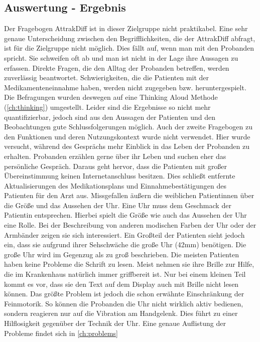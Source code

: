 \subsection{Auswertung - Ergebnis}
Der Fragebogen AttrakDiff ist in dieser Zielgruppe nicht praktikabel. Eine sehr genaue Unterscheidung zwischen den Begrifflichkeiten, die der  AttrakDiff abfragt, ist für die Zielgruppe nicht möglich. Dies fällt auf, wenn man mit den Probanden spricht. Sie schweifen oft ab und man ist nicht in der Lage ihre Aussagen zu erfassen. Direkte Fragen, die den Alltag der Probanden betreffen, werden zuverlässig beantwortet. Schwierigkeiten, die die Patienten mit der Medikamenteneinnahme haben,  werden nicht zugegeben bzw. heruntergespielt.
Die Befragungen wurden deswegen auf eine Thinking Aloud Methode (\ref{ch:thinking}) umgestellt. Leider sind die Ergebnisse so nicht mehr quantifizierbar, jedoch sind aus den Aussagen der Patienten und den Beobachtungen gute Schlussfolgerungen möglich.
Auch der zweite Fragebogen zu den Funktionen und deren Nutzungskontext wurde nicht verwendet. Hier wurde versucht, während des Gesprächs  mehr Einblick in das Leben der Probanden zu erhalten. Probanden erzählen gerne über ihr Leben und suchen eher das persönliche Gespräch. Daraus geht hervor, dass die Patienten mit großer Übereinstimmung keinen Internetanschluss besitzen. Dies schließt entfernte Aktualisierungen des Medikationsplans und Einnahmebestätigungen des Patienten für den Arzt aus. Missgefallen äußern die weiblichen Patientinnen über die Größe und das Aussehen der Uhr. Eine Uhr muss dem Geschmack der Patientin entsprechen. Hierbei spielt die Größe wie auch das Aussehen der Uhr eine Rolle. Bei der Beschreibung von anderen modischen Farben der Uhr oder der Armbänder zeigen sie sich interessiert. Ein Großteil der Patienten sieht jedoch ein, dass sie aufgrund ihrer Sehschwäche die große Uhr (42mm) benötigen. Die große Uhr wird im Gegenzug als zu groß beschrieben. Die meisten Patienten haben keine Probleme die Schrift zu lesen. Meist nehmen sie ihre Brille zur Hilfe, die im Krankenhaus natürlich immer griffbereit ist. Nur bei einem kleinen Teil kommt es vor, dass sie den Text auf dem Display auch mit Brille nicht lesen können. Das größte Problem ist jedoch die schon erwähnte Einschränkung der Feinmotorik. So können die Probanden die Uhr nicht wirklich aktiv bedienen, sondern reagieren nur auf die Vibration am Handgelenk. Dies führt zu einer Hilflosigkeit gegenüber der Technik der Uhr. Eine genaue Auflistung der Probleme findet sich in \ref{ch:problems}

